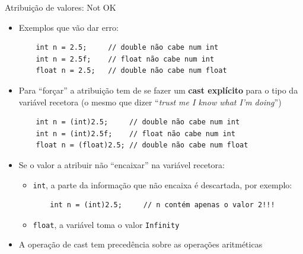 \documentclass[portuguese, aspectratio=169, xcolor=table]{beamer}
\begin{document}
\begin{frame}[fragile]{Atribuição de valores: Not OK}
\begin{itemize}
\item Exemplos que vão dar erro:
\begin{verbatim}
    int n = 2.5;     // double não cabe num int
    int n = 2.5f;    // float não cabe num int
    float n = 2.5;   // double não cabe num float
\end{verbatim}
\item Para ``forçar'' a atribuição tem de se fazer um \textbf{cast explícito} para o tipo da variável recetora (o mesmo que dizer ``\textit{trust me I know what I'm doing}'')
\begin{verbatim}
    int n = (int)2.5;     // double não cabe num int
    int n = (int)2.5f;    // float não cabe num int
    float n = (float)2.5; // double não cabe num float
\end{verbatim}
\item Se o valor a atribuir não ``encaixar'' na variável recetora:
\begin{itemize}
\item \texttt{int}, a parte da informação que não encaixa é descartada, por exemplo:
\begin{verbatim}
    int n = (int)2.5;     // n contém apenas o valor 2!!!
\end{verbatim}
\item \texttt{float}, a variável toma o valor \texttt{Infinity}
\end{itemize} 

\item A operação de cast tem precedência sobre as operações aritméticas 
\end{itemize}
\end{frame}
\end{document}
